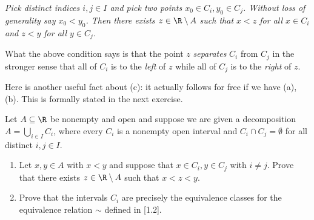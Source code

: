 \documentclass[pmath450]{subfiles}
\begin{document}
    \np\textit{Pick distinct indices $i,j\in I$ and pick two points $x_0\in C_i, y_0\in C_j$. Without loss of generality say $x_0<y_0$. Then there exists $z\in\R\setminus A$ such that $x<z$ for all $x\in C_i$ and $z<y$ for all $y\in C_j$.}

    \np What the above condition says is that the point $z$ \textit{separates} $C_i$ from $C_j$ in the stronger sense that all of $C_i$ is to the \textit{left} of $z$ while all of $C_j$ is to the \textit{right} of $z$.

    Here is another useful fact about (c): it actually follows for free if we have (a), (b). This is formally stated in the next exercise.

    \begin{exercise}{}
        Let $A\subseteq\R$ be nonempty and open and suppose we are given a decomposition $A=\bigcup^{}_{i\in I}C_i$, where every $C_i$ is a nonempty open interval and $C_i\cap C_j=\emptyset$ for all distinct $i,j\in I$.
        \begin{enumerate}
            \item Let $x,y\in A$ with $x<y$ and suppose that $x\in C_i, y\in C_j$ with $i\neq j$. Prove that there exists $z\in\R\setminus A$ such that $x<z<y$.
            \item Prove that the intervals $C_i$ are precisely the equivalence classes for the equivalence relation $\sim$ defined in [1.2]. 
        \end{enumerate}
    \end{exercise}
\end{document}
